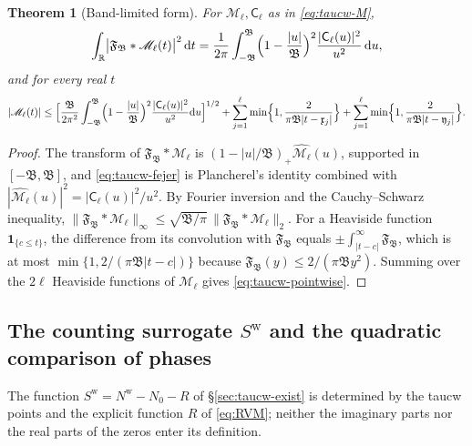 \documentclass[11pt,a4paper]{article}
\numberwithin{equation}{section}
\newtheorem{theorem}{Theorem}[section]
\theoremstyle{definition}
\theoremstyle{remark}
\newcommand{\ind}{\mathbf 1}
\newcommand{\dd}{\,\mathrm dt}
\begin{document}
\begin{theorem}[Band-limited form]\label{thm:taucw-fejer}
For $\mathscr M_\ell,\mathsf C_\ell$ as in \eqref{eq:taucw-M},
\begin{equation}\label{eq:taucw-fejer}
\int_{\mathbb R}\bigl|\mathfrak F_{\mathfrak B}*\mathscr M_\ell(t)\bigr|^2\dd=\frac1{2\pi}\int_{-\mathfrak B}^{\mathfrak B}\Bigl(1-\frac{|u|}{\mathfrak B}\Bigr)^2\frac{|\mathsf C_\ell(u)|^2}{u^2}\,\mathrm du ,
\end{equation}
and for every real $t$
\begin{equation}\label{eq:taucw-pointwise}
|\mathscr M_\ell(t)|\le\Bigl[\frac{\mathfrak B}{2\pi^2}\int_{-\mathfrak B}^{\mathfrak B}\Bigl(1-\frac{|u|}{\mathfrak B}\Bigr)^2\frac{|\mathsf C_\ell(u)|^2}{u^2}\mathrm du\Bigr]^{1/2}+\sum_{j=1}^\ell\min\Bigl\{1,\frac2{\pi\mathfrak B|t-\mathfrak x_j|}\Bigr\}+\sum_{j=1}^\ell\min\Bigl\{1,\frac2{\pi\mathfrak B|t-\mathfrak y_j|}\Bigr\}.
\end{equation}
\end{theorem}
\begin{proof}
The transform of $\mathfrak F_{\mathfrak B}*\mathscr M_\ell$ is $(1-|u|/\mathfrak B)_+\widehat{\mathscr M_\ell}(u)$, supported in $[-\mathfrak B,\mathfrak B]$, and \eqref{eq:taucw-fejer} is Plancherel's identity combined with $|\widehat{\mathscr M_\ell}(u)|^2=|\mathsf C_\ell(u)|^2/u^2$. By Fourier inversion and the Cauchy--Schwarz inequality, $\|\mathfrak F_{\mathfrak B}*\mathscr M_\ell\|_\infty\le\sqrt{\mathfrak B/\pi}\,\|\mathfrak F_{\mathfrak B}*\mathscr M_\ell\|_2$. For a Heaviside function $\ind_{\{c\le t\}}$, the difference from its convolution with $\mathfrak F_{\mathfrak B}$ equals $\pm\int_{|t-c|}^\infty\mathfrak F_{\mathfrak B}$, which is at most $\min\{1,2/(\pi\mathfrak B|t-c|)\}$ because $\mathfrak F_{\mathfrak B}(y)\le2/(\pi\mathfrak By^2)$. Summing over the $2\ell$ Heaviside functions of $\mathscr M_\ell$ gives \eqref{eq:taucw-pointwise}.
\end{proof}

\subsection{The counting surrogate \texorpdfstring{$S^{\mathrm w}$}{Sw} and the quadratic comparison of phases}\label{sec:taucw-S}
The function $S^{\mathrm w}=N^{\mathrm w}-N_0-R$ of \S\ref{sec:taucw-exist} is determined by the taucw points and the explicit function $R$ of \eqref{eq:RVM}; neither the imaginary parts nor the real parts of the zeros enter its definition.
\end{document}
